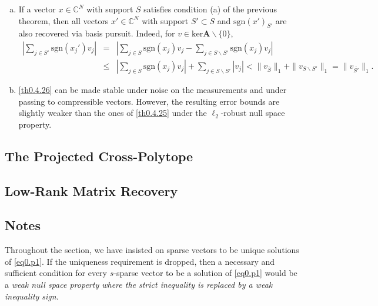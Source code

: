 \begin{remark}
    \label{rmk0.4.27}
    \begin{enumerate}[(a)]
        \item If a vector $x \in \mathbb{C}^N$ with support $S$ satisfies condition (a) of the previous theorem, then all vectors $x' \in \mathbb{C}^N$ with support $S' \subset S$ and $\text{sgn}(x')_{S'}$ are also recovered via basis pursuit. Indeed, for $v \in \text{ker}\mathbf{A} \backslash \{0\}$,
            \begin{eqnarray*}
                \left|\sum\limits_{j\in S'}^{}\text{sgn}(x_j')v_j\right| &=& \left|\sum\limits_{j \in S}^{}\text{sgn}(x_j)v_j - \sum\limits_{j \in S\backslash S'}^{}\text{sgn}(x_j)v_j\right| \\
                &\leq& \left|\sum\limits_{j \in S}^{}\text{sgn}(x_j)v_j \right| + \sum\limits_{j \in S \backslash S'}^{}|v_j| < \|v_{\overline{S}}\|_1 + \|v_{S \backslash S'}\|_1 = \|v_{\overline{S'}}\|_1.
            \end{eqnarray*}
        \item \cref{th0.4.26} can be made stable under noise on the measurements and under passing to compressible vectors. However, the resulting error bounds are slightly weaker than the ones of \cref{th0.4.25} under the $\ell_2$-robust null space property.
    \end{enumerate}
\end{remark}

\subsection{The Projected Cross-Polytope}

\subsection{Low-Rank Matrix Recovery}

\subsection{Notes}

Throughout the section, we have insisted on sparse vectors to be unique solutions of \cref{eq0.p1}. If the uniqueness requirement is dropped, then a necessary and sufficient condition for every $s$-sparse vector to be a solution of \cref{eq0.p1} would be a \textcolor[rgb]{1,0,0}{\emph{weak null space property where the strict inequality is replaced by a weak inequality sign}}.










